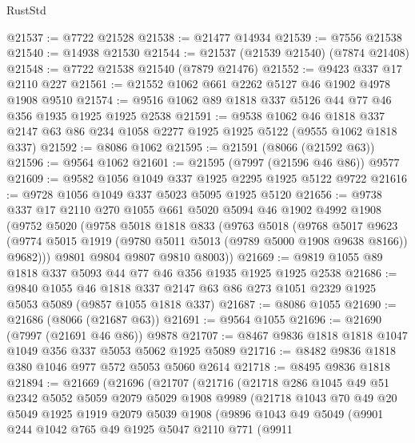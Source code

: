 \begin{lexlean}{RustStd}
\begin{coremodule}
@21537 := @7722 @21528
@21538 := @21477 @14934
@21539 := @7556 @21538
@21540 := @14938 @21530
@21544 := @21537 (@21539 @21540) (@7874 @21408)
@21548 := @7722 @21538 @21540 (@7879 @21476)
@21552 := @9423 @337 @17 @2110 @227
@21561 := @21552 @1062 @661 @2262 @5127 @46 @1902 @4978 @1908 @9510
@21574 := @9516 @1062 @89 @1818 @337 @5126 @44 @77 @46 @356 @1935 @1925 @1925 @2538
@21591 := @9538
    @1062
    @46
    @1818
    @337
    @2147
    @63
    @86
    @234
    @1058
    @2277
    @1925
    @1925
    @5122
    (@9555 @1062 @1818 @337)
@21592 := @8086 @1062
@21595 := @21591 (@8066 (@21592 @63))
@21596 := @9564 @1062
@21601 := @21595 (@7997 (@21596 @46 @86)) @9577
@21609 := @9582 @1056 @1049 @337 @1925 @2295 @1925 @5122 @9722
@21616 := @9728 @1056 @1049 @337 @5023 @5095 @1925 @5120
@21656 := @9738
    @337
    @17
    @2110
    @270
    @1055
    @661
    @5020
    @5094
    @46
    @1902
    @4992
    @1908
    (@9752
      @5020
      (@9758
        @5018
        @1818
        @833
        (@9763
          @5018
          (@9768
            @5017
            @9623
            (@9774 @5015 @1919 (@9780 @5011 @5013 (@9789 @5000 @1908 @9638 @8166)) @9682)))
        @9801
        @9804
        @9807
        @9810
        @8003))
@21669 := @9819 @1055 @89 @1818 @337 @5093 @44 @77 @46 @356 @1935 @1925 @1925 @2538
@21686 := @9840
    @1055
    @46
    @1818
    @337
    @2147
    @63
    @86
    @273
    @1051
    @2329
    @1925
    @5053
    @5089
    (@9857 @1055 @1818 @337)
@21687 := @8086 @1055
@21690 := @21686 (@8066 (@21687 @63))
@21691 := @9564 @1055
@21696 := @21690 (@7997 (@21691 @46 @86)) @9878
@21707 := @8467 @9836 @1818 @1818 @1047 @1049 @356 @337 @5053 @5062 @1925 @5089
@21716 := @8482 @9836 @1818 @380 @1046 @977 @572 @5053 @5060 @2614
@21718 := @8495 @9836 @1818
@21894 := @21669
    (@21696
      (@21707
        (@21716
          (@21718
            @286
            @1045
            @49
            @51
            @2342
            @5052
            @5059
            @2079
            @5029
            @1908
            @9989
            (@21718
              @1043
              @70
              @49
              @20
              @5049
              @1925
              @1919
              @2079
              @5039
              @1908
              (@9896
                @1043
                @49
                @5049
                (@9901
                  @244
                  @1042
                  @765
                  @49
                  @1925
                  @5047
                  @2110
                  @771
                  (@9911

\end{coremodule}
\end{lexlean}
